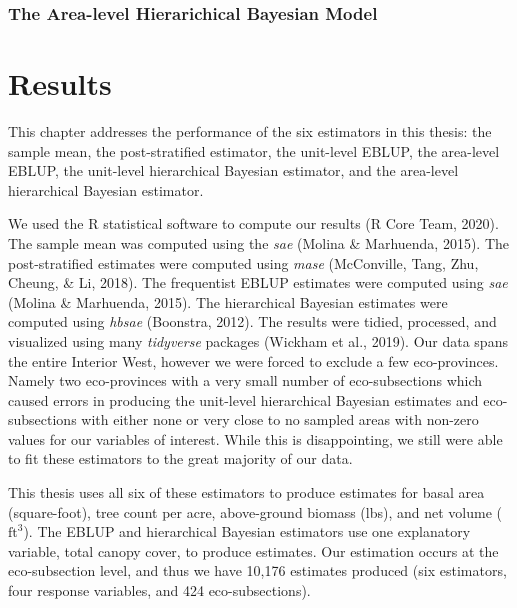 \documentclass[12pt,twoside]{reedthesis}
\begin{document}
\hypertarget{the-area-level-hierarichical-bayesian-model}{%
\subsection{The Area-level Hierarichical Bayesian Model}\label{the-area-level-hierarichical-bayesian-model}}

\hypertarget{results}{%
\chapter{Results}\label{results}}

This chapter addresses the performance of the six estimators in this thesis: the sample mean, the post-stratified estimator, the unit-level EBLUP, the area-level EBLUP, the unit-level hierarchical Bayesian estimator, and the area-level hierarchical Bayesian estimator.

We used the R statistical software to compute our results (R Core Team, 2020). The sample mean was computed using the \emph{sae} (Molina \& Marhuenda, 2015). The post-stratified estimates were computed using \emph{mase} (McConville, Tang, Zhu, Cheung, \& Li, 2018). The frequentist EBLUP estimates were computed using \emph{sae} (Molina \& Marhuenda, 2015). The hierarchical Bayesian estimates were computed using \emph{hbsae} (Boonstra, 2012). The results were tidied, processed, and visualized using many \emph{tidyverse} packages (Wickham et al., 2019). Our data spans the entire Interior West, however we were forced to exclude a few eco-provinces. Namely two eco-provinces with a very small number of eco-subsections which caused errors in producing the unit-level hierarchical Bayesian estimates and eco-subsections with either none or very close to no sampled areas with non-zero values for our variables of interest. While this is disappointing, we still were able to fit these estimators to the great majority of our data.

This thesis uses all six of these estimators to produce estimates for basal area (square-foot), tree count per acre, above-ground biomass (lbs), and net volume (\(\text{ft}^3\)). The EBLUP and hierarchical Bayesian estimators use one explanatory variable, total canopy cover, to produce estimates. Our estimation occurs at the eco-subsection level, and thus we have 10,176 estimates produced (six estimators, four response variables, and 424 eco-subsections).
\end{document}
